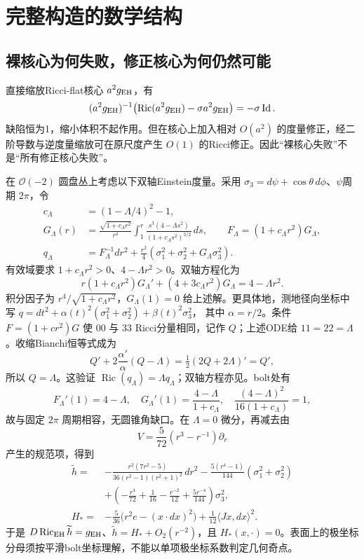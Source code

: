 \documentclass[UTF8,a4paper,11pt,fontset=fandol]{ctexart}
\numberwithin{equation}{section}
\theoremstyle{definition}
\newcommand{\Ric}{\operatorname{Ric}}
\newcommand{\Id}{\operatorname{Id}}
\begin{document}
\section{完整构造的数学结构}
\subsection{裸核心为何失败，修正核心为何仍然可能}
直接缩放Ricci-flat核心 $a^2g_{\rm EH}$，有
\[
(a^2g_{\rm EH})^{-1}\bigl(\Ric(a^2g_{\rm EH})-\sigma a^2g_{\rm EH}\bigr)=-\sigma\Id.
\]
缺陷恒为1，缩小体积不起作用。但在核心上加入相对 $O(a^2)$ 的度量修正，经二阶导数与逆度量缩放可在原尺度产生 $O(1)$ 的Ricci修正。因此“裸核心失败”不是“所有修正核心失败”。

在 $\mathcal O(-2)$ 圆盘丛上考虑以下双轴Einstein度量。采用 $\sigma_3=d\psi+\cos\theta\,d\phi$、$\psi$周期 $2\pi$，令
\begin{align}
c_\Lambda&=(1-\Lambda/4)^2-1,\\
G_\Lambda(r)&=\frac{\sqrt{1+c_\Lambda r^2}}{r^4}
\int_1^r\frac{s^3(4-\Lambda s^2)}{(1+c_\Lambda s^2)^{3/2}}\,ds,
\qquad F_\Lambda=(1+c_\Lambda r^2)G_\Lambda,\\
q_\Lambda&=F_\Lambda^{-1}dr^2+
\frac{r^2}{4}(\sigma_1^2+\sigma_2^2+G_\Lambda\sigma_3^2).
\end{align}
有效域要求 $1+c_\Lambda r^2>0$、$4-\Lambda r^2>0$。双轴方程化为
\[
r(1+c_\Lambda r^2)G_\Lambda'+(4+3c_\Lambda r^2)G_\Lambda
=4-\Lambda r^2.
\]
积分因子为 $r^4/\sqrt{1+c_\Lambda r^2}$，$G_\Lambda(1)=0$ 给上述解。更具体地，测地径向坐标中写
$q=dt^2+\alpha(t)^2(\sigma_1^2+\sigma_2^2)+\beta(t)^2\sigma_3^2$，
其中 $\alpha=r/2$。条件 $F=(1+cr^2)G$ 使 $00$ 与 $33$ Ricci分量相同，记作 $Q$；上述ODE给 $11=22=\Lambda$。收缩Bianchi恒等式成为
\[
Q'+2\frac{\alpha'}{\alpha}(Q-\Lambda)=\tfrac12(2Q+2\Lambda)'=Q',
\]
所以 $Q=\Lambda$。这验证 $\Ric(q_\Lambda)=\Lambda q_\Lambda$；双轴方程亦见\cite[\S4.1]{CGLP}。bolt处有
\[
F_\Lambda'(1)=4-\Lambda,
\quad G_\Lambda'(1)=\frac{4-\Lambda}{1+c_\Lambda},
\quad \frac{(4-\Lambda)^2}{16(1+c_\Lambda)}=1,
\]
故与固定 $2\pi$ 周期相容，无圆锥角缺口。在 $\Lambda=0$ 微分，再减去由
\[
V=\frac5{72}(r^3-r^{-1})\partial_r
\]
产生的规范项，得到
\begin{align}
\widetilde h={}&-\frac{r^2(7r^2-5)}{36(r^2-1)(r^2+1)^2}\,dr^2
-\frac{5(r^4-1)}{144}(\sigma_1^2+\sigma_2^2)\\
&+\left(-\frac{r^4}{72}+\frac1{16}-\frac{r^{-2}}{12}
+\frac{5r^{-4}}{144}\right)\sigma_3^2,\nonumber\\
H_*={}&-\frac5{36}\bigl(r^2e-(x\cdot dx)^2\bigr)
+\frac1{12}\langle Jx,dx\rangle^2.
\end{align}
于是 $D\Ric_{\rm EH}\widetilde h=g_{\rm EH}$、$\widetilde h=H_*+O_2(r^{-2})$，且 $H_*(x,\cdot)=0$。表面上的极坐标分母须按平滑bolt坐标理解，不能以单项极坐标系数判定几何奇点。
\end{document}
